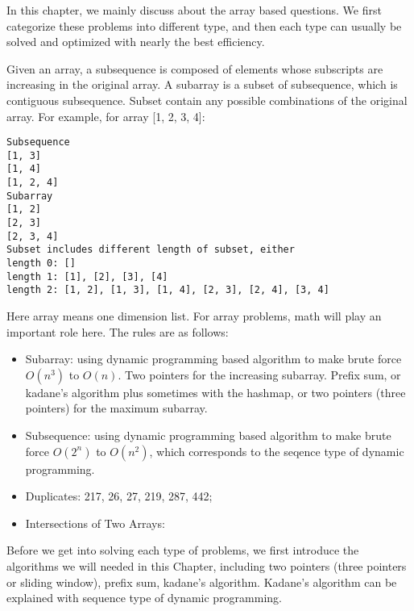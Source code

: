 \documentclass[../main.tex]{subfiles}
\begin{document}

In this chapter, we mainly discuss about the array based questions. We first categorize these problems into different type, and then each type can usually be solved and optimized with nearly the best efficiency. 

Given an array, a subsequence is composed of elements whose subscripts are increasing in the original array. A subarray is a subset of subsequence, which is contiguous subsequence. Subset contain any possible combinations of the original array. For example, for array [1, 2, 3, 4]:
\begin{lstlisting}[numbers=none]
Subsequence
[1, 3]
[1, 4]
[1, 2, 4]
Subarray
[1, 2]
[2, 3]
[2, 3, 4]
Subset includes different length of subset, either
length 0: []
length 1: [1], [2], [3], [4]
length 2: [1, 2], [1, 3], [1, 4], [2, 3], [2, 4], [3, 4]
\end{lstlisting}

Here array means one dimension list. For array problems, math will play an important role here. The rules are as follows:
\begin{itemize}
    \item Subarray: using dynamic programming based algorithm to make brute force $O(n^3)$ to $O(n)$. Two pointers for the increasing subarray. Prefix sum, or kadane's algorithm plus sometimes with the hashmap, or two pointers (three pointers) for the maximum subarray. 
    \item Subsequence: using dynamic programming based algorithm to make brute force $O(2^n)$ to $O(n^2)$, which corresponds to the seqence type of dynamic programming. 
    \item Duplicates: 217, 26, 27, 219, 287, 442;
    \item Intersections of Two Arrays: 
\end{itemize}

Before we get into solving each type of problems, we first introduce the algorithms we will needed in this Chapter, including two pointers (three pointers or sliding window), prefix sum, kadane's algorithm. Kadane's algorithm can be explained with sequence type of dynamic programming. 

    
\end{document}
